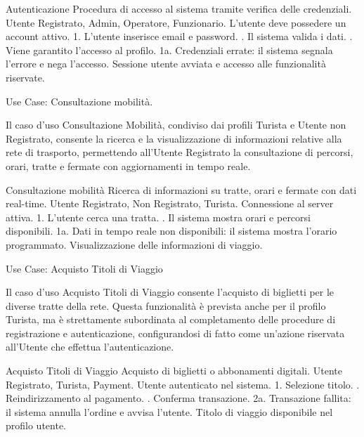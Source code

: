 \vspace{0.5cm}

\usecasetable
{Autenticazione}
{Procedura di accesso al sistema tramite verifica delle credenziali.}
{Utente Registrato, Admin, Operatore, Funzionario.}
{L'utente deve possedere un account attivo.}
{1. L'utente inserisce email e password. . Il sistema valida i dati. . Viene garantito l'accesso al profilo.}
{1a. Credenziali errate: il sistema segnala l'errore e nega l'accesso.}
{Sessione utente avviata e accesso alle funzionalità riservate.}
\newpage
\begin{center}
    Use Case: Consultazione mobilità. 
\end{center}
Il caso d'uso Consultazione Mobilità, condiviso dai profili Turista e Utente non Registrato, consente la ricerca e la visualizzazione di informazioni relative alla rete di trasporto, permettendo all'Utente Registrato la consultazione di percorsi, orari, tratte e fermate con aggiornamenti in tempo reale. 

\vspace{0.5cm}

\usecasetable
{Consultazione mobilità}
{Ricerca di informazioni su tratte, orari e fermate con dati real-time.}
{Utente Registrato, Non Registrato, Turista.}
{Connessione al server attiva.}
{1. L'utente cerca una tratta. . Il sistema mostra orari e percorsi disponibili.}
{1a. Dati in tempo reale non disponibili: il sistema mostra l'orario programmato.}
{Visualizzazione delle informazioni di viaggio.}
\newpage

\begin{center}
    Use Case: Acquisto Titoli di Viaggio
\end{center}
Il caso d'uso Acquisto Titoli di Viaggio consente l'acquisto di biglietti per le diverse tratte della rete. Questa funzionalità è prevista anche per il profilo Turista, ma è strettamente subordinata al completamento delle procedure di registrazione e autenticazione, configurandosi di fatto come un'azione riservata all'Utente che effettua l'autenticazione. 

\vspace{0.5cm}

\usecasetable
{Acquisto Titoli di Viaggio}
{Acquisto di biglietti o abbonamenti digitali.}
{Utente Registrato, Turista, Payment.}
{Utente autenticato nel sistema.}
{1. Selezione titolo. . Reindirizzamento al pagamento. . Conferma transazione.}
{2a. Transazione fallita: il sistema annulla l'ordine e avvisa l'utente.}
{Titolo di viaggio disponibile nel profilo utente.}

